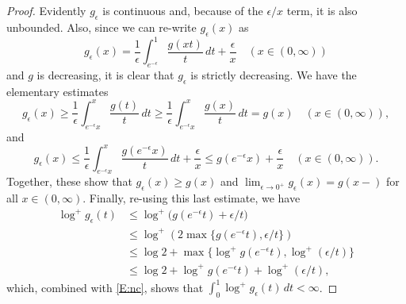\documentclass[11pt,reqno]{amsart}
\theoremstyle{plain}
\theoremstyle{definition}
\theoremstyle{remark}
\begin{document}
\begin{proof}
Evidently $g_\epsilon$ is continuous and, because of the
$\epsilon/x$ term, it is also unbounded. Also, since
we can re-write $g_\epsilon(x)$ as
\[
g_\epsilon(x)=\frac{1}{\epsilon}\int_{e^{-\epsilon}}^1 \frac{g(xt)}{t}\,dt+\frac{\epsilon}{x} \quad(x\in(0,\infty))
\]
and $g$ is decreasing, it is clear that $g_\epsilon$ is strictly decreasing. 
We have the elementary estimates
\[
g_\epsilon(x)
\ge \frac{1}{\epsilon}\int_{e^{-\epsilon}x}^x \frac{g(t)}{t}\,dt
\ge \frac{1}{\epsilon}\int_{e^{-\epsilon}x}^x \frac{g(x)}{t}\,dt
=g(x) \quad(x\in(0,\infty)),
\]
and 
\[
g_\epsilon(x)
\le \frac{1}{\epsilon}\int_{e^{-\epsilon}x}^x \frac{g(e^{-\epsilon}x)}{t}\,dt+\frac{\epsilon}{x}
\le g(e^{-\epsilon}x)+\frac{\epsilon}{x}
\quad(x\in(0,\infty)).
\]
Together, these show that $g_\epsilon(x)\ge g(x)$ and
$\lim_{\epsilon\to0^+}g_\epsilon(x)=g(x-)$ for all $x\in(0,\infty)$.
Finally, re-using this last estimate, we have
\begin{align}
\log^+ g_\epsilon(t)
&\le \log^+\bigl(g(e^{-\epsilon}t)+\epsilon/t\bigr)\nonumber\\
&\le \log^+(2\max\{g(e^{-\epsilon}t),\epsilon/t\})\nonumber\\
&\le \log 2+\max\{\log^+g(e^{-\epsilon}t),\log^+(\epsilon/t)\}\nonumber\\
&\le \log 2+\log^+g(e^{-\epsilon}t)+\log^+(\epsilon/t),
\label{E:log+est}
\end{align}
which, combined with \eqref{E:nc}, shows that $\int_0^1\log^+ g_\epsilon(t)\,dt<\infty$.
\end{proof}
\end{document}
